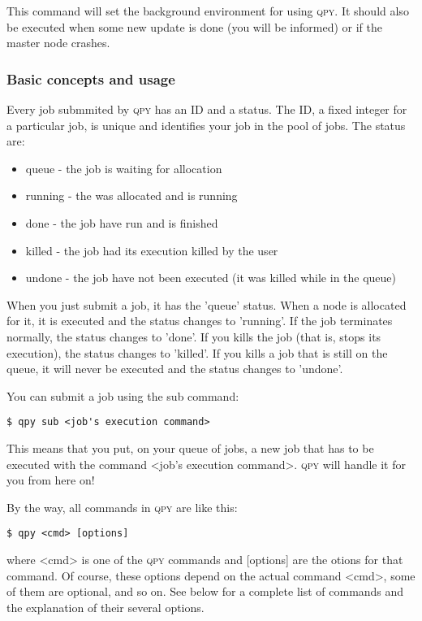 \documentclass[a4paper,12pt]{article}
\newcommand{\qpy}{\textsc{qpy}}
\begin{document}
This command will set the background environment for using \qpy{}.
It should also be executed when some new update is done (you will be informed) or if the master node crashes.


\subsubsection{Basic concepts and usage}

Every job submmited by \qpy{} has an ID and a status.
The ID, a fixed integer for a particular job, is unique and identifies your job in the pool of jobs.
The status are:

\begin{itemize}
\item queue   - the job is waiting for allocation
\item running - the was allocated and is running
\item done    - the job have run and is finished
\item killed  - the job had its execution killed by the user
\item undone  - the job have not been executed (it was killed while in the queue)
\end{itemize}

When you just submit a job, it has the 'queue' status.
When a node is allocated for it, it is executed and the status changes to 'running'.
If the job terminates normally, the status changes to 'done'.
If you kills the job (that is, stops its execution), the status changes to 'killed'.
If you kills a job that is still on the queue, it will never be executed and the status changes to 'undone'.


You can submit a job using the sub command:

\begin{lstlisting}[style=BashStyle]
$ qpy sub <job's execution command>
\end{lstlisting}

This means that you put, on your queue of jobs, a new job that has to be executed with the command <job's execution command>.
\qpy{} will handle it for you from here on!

By the way, all commands in \qpy{} are like this:

\begin{lstlisting}[style=BashStyle]
$ qpy <cmd> [options]
\end{lstlisting}

where <cmd> is one of the \qpy{} commands and [options] are the otions for that command.
Of course, these options depend on the actual command <cmd>, some of them are optional, and so on.
See below for a complete list of commands and the explanation of their several options.
\end{document}
